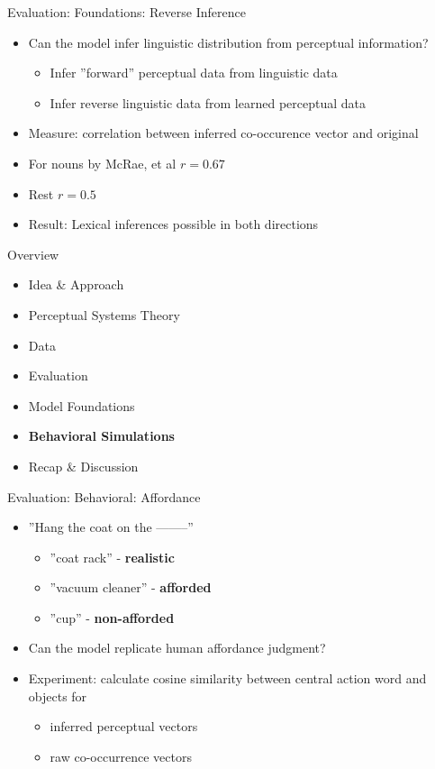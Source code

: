 \documentclass[12pt,a4paper]{beamer}
\begin{document}
\begin{frame}{Evaluation: Foundations: Reverse Inference}
\begin{itemize}
\item Can the model infer linguistic distribution from perceptual information?
    \begin{itemize}
    \item Infer ''forward'' perceptual data from linguistic data
    \item Infer reverse linguistic data from learned perceptual data
    \end{itemize}
\item Measure: correlation between inferred co-occurence vector and original
\item For nouns by McRae, et al $r = 0.67$
\item Rest $r = 0.5$
\item Result: Lexical inferences possible in both directions
\end{itemize}
\end{frame}


\begin{frame}{Overview}
\begin{itemize}
\item Idea \& Approach 
\item Perceptual Systems Theory
\item Data
\item Evaluation
    \item Model Foundations
    \item \textbf{Behavioral Simulations}
\item Recap \& Discussion
\end{itemize}
\end{frame}


\begin{frame}{Evaluation: Behavioral: Affordance}
\begin{itemize}
\item ''Hang the coat on the --------''
    \begin{itemize}
    \item ''coat rack'' - \textbf{realistic}
    \item ''vacuum cleaner'' - \textbf{afforded}
    \item ''cup'' - \textbf{non-afforded}
    \end{itemize}
\item Can the model replicate human affordance judgment?
\item Experiment: calculate cosine similarity between central action word and objects for
    \begin{itemize}
    \item inferred perceptual vectors
    \item raw co-occurrence vectors
    \end{itemize}
\end{itemize}
\end{frame}
\end{document}
